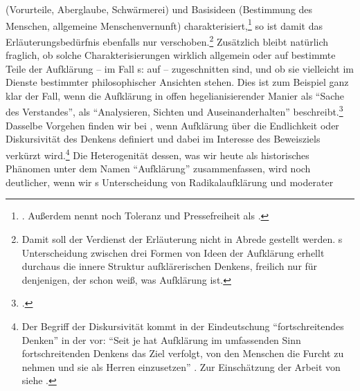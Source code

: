 (Vorurteile, Aberglaube, Schwärmerei) und Basisideen (Bestimmung des Menschen,
allgemeine Menschenvernunft)
charakterisiert,\footnote{\cite[Vgl.][392--398]{Hinske:ArtikelAufklaerung1985}.
Außerdem nennt  noch Toleranz und
Pressefreiheit als 
\parencite[vgl.][\pno~398\,f.]{Hinske:ArtikelAufklaerung1985}.} so ist damit das
Erläuterungsbedürfnis ebenfalls nur verschoben.\footnote{Damit soll der
Verdienst der Erläuterung nicht in Abrede gestellt werden.
s Unterscheidung zwischen drei Formen von Ideen der
Aufklärung erhellt durchaus die innere Struktur aufklärerischen Denkens,
freilich nur für denjenigen, der schon weiß, was Aufklärung ist.} Zusätzlich
bleibt natürlich fraglich, ob solche Charakterisierungen wirklich allgemein oder
auf bestimmte Teile der Aufklärung -- im Fall s: auf
 -- zugeschnitten sind, und ob sie vielleicht im Dienste
bestimmter philosophischer Ansichten stehen. Dies ist zum Beispiel ganz klar der
Fall, wenn
 die
Aufklärung in offen hegelianisierender Manier als \enquote{Sache des
Verstandes}, als \enquote{Analysieren, \punkt{} Sichten und Auseinanderhalten}
beschreibt.\footcite[][\pno~31\,f.]{Sternberg:AufklaerungKlassizismusundRomantikbeiKant1931}
Dasselbe Vorgehen finden wir bei
, wenn Aufklärung über die
Endlichkeit oder Diskursivität des Denkens definiert und dabei im Interesse des
Beweisziels verkürzt wird.\footnote{Der Begriff der Diskursivität kommt in der
Eindeutschung \enquote{fortschreitendes Denken} in der  vor: \enquote{Seit je hat Aufklärung im umfassenden Sinn
fortschreitenden Denkens das Ziel verfolgt, von den Menschen die Furcht zu
nehmen und sie als Herren einzusetzen}
\parencite[][19]{Horkheimer:DialektikderAufklaerung1997}. Zur Einschätzung der
Arbeit von  siehe
\cite[][xiii--xv]{Hinske:Einleitung1990}.}
Die Heterogenität dessen, was wir heute als historisches Phänomen unter dem Namen
\enquote{Aufklärung} zusammenfassen, wird noch deutlicher, wenn wir
s Unterscheidung von Radikalaufklärung und moderater
